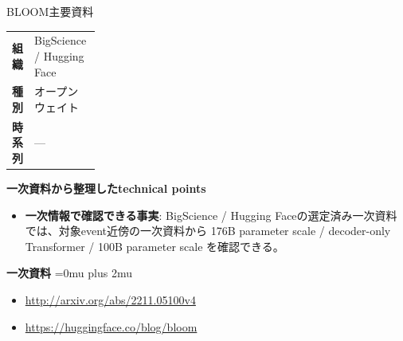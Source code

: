 \begin{technicalnote}{BLOOM}{主要資料}
\begingroup
\begin{tabularx}{\linewidth}{@{}>{\bfseries}p{0.22\linewidth}X@{}}
組織 & BigScience / Hugging Face \\
種別 & オープンウェイト \\
時系列 & — \\
\end{tabularx}
\smallskip
{\bfseries 一次資料から整理したtechnical points}
\begin{itemize}[leftmargin=1.5em,itemsep=0.35em]
\item \textbf{一次情報で確認できる事実}: BigScience / Hugging Faceの選定済み一次資料では、対象event近傍の一次資料から 176B parameter scale / decoder-only Transformer / 100B parameter scale を確認できる。
\end{itemize}
\begin{minipage}{\linewidth}
\begin{samepage}
{\bfseries 一次資料}
\begingroup\sloppy
\Urlmuskip=0mu plus 2mu\relax
\begin{itemize}[leftmargin=1.5em,itemsep=0.25em]
\item {\scriptsize\url{http://arxiv.org/abs/2211.05100v4}}
\item {\scriptsize\url{https://huggingface.co/blog/bloom}}
\end{itemize}
\endgroup
\end{samepage}
\end{minipage}
\endgroup
\end{technicalnote}
\medskip

